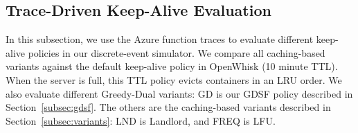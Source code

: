 \subsection{Trace-Driven Keep-Alive Evaluation}

In this subsection, we use the Azure function traces to evaluate different keep-alive policies in our discrete-event simulator. 
We compare all caching-based variants against the default keep-alive policy in OpenWhisk (10 minute TTL).
When the server is full, this TTL policy evicts containers in an LRU order.
We also evaluate different Greedy-Dual variants: GD is our GDSF policy described in Section~\ref{subsec:gdsf}.
The others are the caching-based variants described in Section~\ref{subsec:variants}: LND is Landlord, and FREQ is LFU. 


